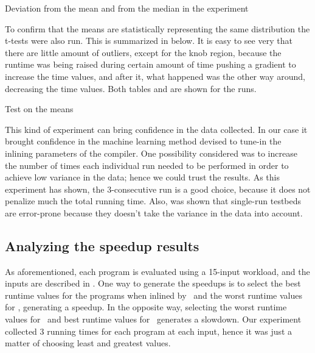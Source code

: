 \begin{table}
  \centering
  \begin{tiny}
  
  \end{tiny}
  \caption{Deviation from the mean and from the median in the experiment}
  \label{tab:simStats}
\end{table}

To confirm that the means are statistically representing the same distribution the t-tests were also run. This is summarized in  below. It is easy to see very that there are little amount of outliers, except for the knob region, because the runtime was being raised during certain amount of time pushing a gradient to increase the time values, and after it, what happened was the other way around, decreasing the time values. Both tables  and  are shown for the runs.

\begin{table}
  \centering
  \begin{tiny}
  
  \end{tiny}
  \caption{Test on the means}
  \label{tab:statTest}
\end{table}

This kind of experiment can bring confidence in the data collected. In our case it brought confidence in the machine learning method devised to tune-in the inlining parameters of the compiler. One possibility considered was to increase the number of times each individual run needed to be performed in order to achieve low variance in the data; hence we could trust the results. As this experiment has shown, the $3$-consecutive run is a good choice, because it does not penalize much the total running time. Also, was shown that single-run testbeds are error-prone because they doesn't take the variance in the data into account.

\subsection{Analyzing the speedup results}

As aforementioned, each program is evaluated using a 15-input workload, and the inputs are described in . One way to generate the speedups is to select the best runtime values for the programs when inlined by \FDI\ and the worst runtime values for \llvm, generating a speedup. In the opposite way, selecting the worst runtime values for \FDI\ and best runtime values for \llvm\ generates a slowdown. Our experiment collected $3$ running times for each program at each input, hence it was just a matter of choosing least and greatest values.

